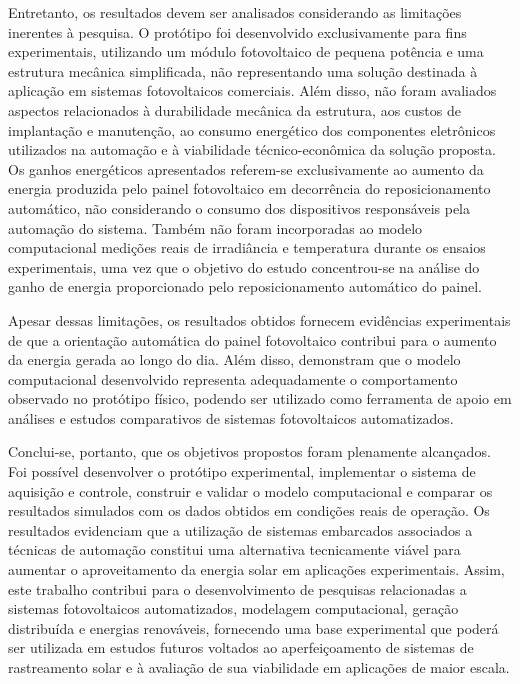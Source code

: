Entretanto, os resultados devem ser analisados considerando as limitações inerentes à pesquisa. O protótipo foi desenvolvido exclusivamente para fins experimentais, utilizando um módulo fotovoltaico de pequena potência e uma estrutura mecânica simplificada, não representando uma solução destinada à aplicação em sistemas fotovoltaicos comerciais. Além disso, não foram avaliados aspectos relacionados à durabilidade mecânica da estrutura, aos custos de implantação e manutenção, ao consumo energético dos componentes eletrônicos utilizados na automação e à viabilidade técnico-econômica da solução proposta. Os ganhos energéticos apresentados referem-se exclusivamente ao aumento da energia produzida pelo painel fotovoltaico em decorrência do reposicionamento automático, não considerando o consumo dos dispositivos responsáveis pela automação do sistema. Também não foram incorporadas ao modelo computacional medições reais de irradiância e temperatura durante os ensaios experimentais, uma vez que o objetivo do estudo concentrou-se na análise do ganho de energia proporcionado pelo reposicionamento automático do painel.

Apesar dessas limitações, os resultados obtidos fornecem evidências experimentais de que a orientação automática do painel fotovoltaico contribui para o aumento da energia gerada ao longo do dia. Além disso, demonstram que o modelo computacional desenvolvido representa adequadamente o comportamento observado no protótipo físico, podendo ser utilizado como ferramenta de apoio em análises e estudos comparativos de sistemas fotovoltaicos automatizados.

Conclui-se, portanto, que os objetivos propostos foram plenamente alcançados. Foi possível desenvolver o protótipo experimental, implementar o sistema de aquisição e controle, construir e validar o modelo computacional e comparar os resultados simulados com os dados obtidos em condições reais de operação. Os resultados evidenciam que a utilização de sistemas embarcados associados a técnicas de automação constitui uma alternativa tecnicamente viável para aumentar o aproveitamento da energia solar em aplicações experimentais. Assim, este trabalho contribui para o desenvolvimento de pesquisas relacionadas a sistemas fotovoltaicos automatizados, modelagem computacional, geração distribuída e energias renováveis, fornecendo uma base experimental que poderá ser utilizada em estudos futuros voltados ao aperfeiçoamento de sistemas de rastreamento solar e à avaliação de sua viabilidade em aplicações de maior escala.